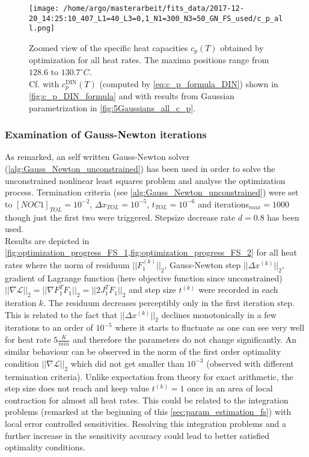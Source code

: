\documentclass{scrartcl}[12pt, halfparskip]
\numberwithin{equation}{section}
\numberwithin{figure}{section}
\numberwithin{table}{section}
\begin{document}
\begin{figure}[H]
	\centering
	\texttt{[image: /home/argo/masterarbeit/fits\_data/2017-12-20\_14:25:10\_407\_L1=40\_L3=0,1\_N1=300\_N3=50\_GN\_FS\_used/c\_p\_all.png]}
	\caption{Zoomed view of the specific heat capacities $c_p(T)$ obtained by optimization for all heat rates. The maxima positions range from $128.6$ to $130.7^{\circ}C$. \\
	Cf. with $c_p^{\text{DIN}}(T)$ (computed by \cref{eq:c_p_formula_DIN}) shown in \cref{fig:c_p_DIN_formula} and with results from Gaussian parametrization in \cref{fig:5Gaussians_all_c_p}.}
	\label{fig:FS_all_c_p}
\end{figure}

\subsubsection{Examination of Gauss-Newton iterations}
\label{sec:param_estimation_fs_examin_GN}

As remarked, an self written Gauss-Newton solver (\cref{alg:Gauss_Newton_unconstrained}) has been used in order to solve the unconstrained nonlinear least squares problem and analyse the optimization process. Termination criteria (see \cref{alg:Gauss_Newton_unconstrained}) were set to $[NOC1]_{TOL}=10^{-2}$, $\Delta x_{TOL}=10^{-5}$, $t_{TOL}=10^{-6}$ and iterations$_{max}=1000$ though just the first two were triggered. Stepsize decrease rate $d=0.8$ has been used. \\
Results are depicted in \cref{fig:optimization_progress_FS_1,fig:optimization_progress_FS_2} for all heat rates where the norm of residuum $||F_1^{(k)}||_2$, Gauss-Newton step $||\Delta x^{(k)}||_2$, gradient of Lagrange function (here objective function since unconstrained) $|| \nabla \mathcal{L} ||_2 = || \nabla F_1^T F_1 ||_2 = || 2 J_1^T F_1 ||_2$ and step size $t^{(k)}$ were recorded in each iteration $k$. The residuum decreases perceptibly only in the first iteration step. This is related to the fact that $||\Delta x^{(k)}||_2$ declines monotonically in a few iterations to an order of $10^{-5}$ where it starts to fluctuate as one can see very well for heat rate $5 \frac{K}{min}$ and therefore the parameters do not change significantly. 
An similar behaviour can be observed in the norm of the first order optimality condition  $|| \nabla \mathcal{L} ||_2$ which did not get smaller than $10^{-3}$ (observed with different termination criteria).
Unlike expectation from theory for exact arithmetic, the step size does not reach and keep value $t^{(k)}=1$ once in an area of local contraction for almost all heat rates. 
This could be related to the integration problems (remarked at the beginning of this \cref{sec:param_estimation_fs}) with local error controlled sensitivities. Resolving this integration problems and a further increase in the sensitivity accuracy could lead to better satisfied optimality conditions.
\end{document}
